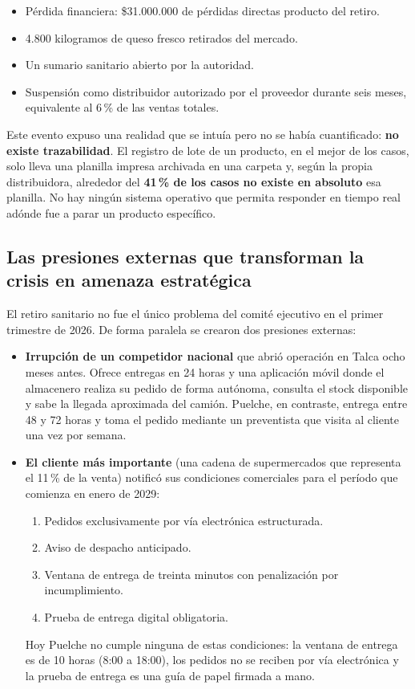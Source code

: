 \begin{itemize}
  \item Pérdida financiera: \$31.000.000 de pérdidas directas producto del retiro.
  \item 4.800 kilogramos de queso fresco retirados del mercado.
  \item Un sumario sanitario abierto por la autoridad.
  \item Suspensión como distribuidor autorizado por el proveedor durante seis meses,
        equivalente al 6\,\% de las ventas totales.
\end{itemize}

Este evento expuso una realidad que se intuía pero no se había cuantificado: \textbf{no
existe trazabilidad}. El registro de lote de un producto, en el mejor de los casos, solo
lleva una planilla impresa archivada en una carpeta y, según la propia distribuidora,
alrededor del \textbf{41\,\% de los casos no existe en absoluto} esa planilla. No hay
ningún sistema operativo que permita responder en tiempo real adónde fue a parar un
producto específico.

\subsection{Las presiones externas que transforman la crisis en amenaza estratégica}

El retiro sanitario no fue el único problema del comité ejecutivo en el primer trimestre
de 2026. De forma paralela se crearon dos presiones externas:

\begin{itemize}
  \item \textbf{Irrupción de un competidor nacional} que abrió operación en Talca ocho
        meses antes. Ofrece entregas en 24 horas y una aplicación móvil donde el
        almacenero realiza su pedido de forma autónoma, consulta el stock disponible y
        sabe la llegada aproximada del camión. Puelche, en contraste, entrega entre 48 y
        72 horas y toma el pedido mediante un preventista que visita al cliente una vez
        por semana.
  \item \textbf{El cliente más importante} (una cadena de supermercados que representa el
        11\,\% de la venta) notificó sus condiciones comerciales para el período que
        comienza en enero de 2029:
        \begin{enumerate}
          \item Pedidos exclusivamente por vía electrónica estructurada.
          \item Aviso de despacho anticipado.
          \item Ventana de entrega de treinta minutos con penalización por
                incumplimiento.
          \item Prueba de entrega digital obligatoria.
        \end{enumerate}
        Hoy Puelche no cumple ninguna de estas condiciones: la ventana de entrega es de
        10 horas (8:00 a 18:00), los pedidos no se reciben por vía electrónica y la
        prueba de entrega es una guía de papel firmada a mano.
\end{itemize}

